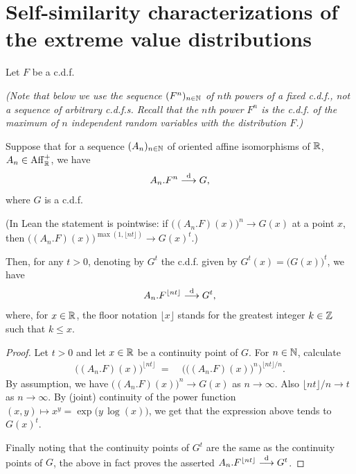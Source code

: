 \section{Self-similarity characterizations of the extreme value distributions}

\begin{lemma}
  \label{lem:continuous-parameter-ev-limit}
  \leanok
  Let $F$ be a c.d.f.

  \emph{(Note that below we use
  the sequence $(F^n)_{n \in \mathbb{N}}$ of $n$th powers of a fixed c.d.f.,
  not a sequence of arbitrary c.d.f.s.
  Recall that the $n$th power $F^n$ is the c.d.f. of the maximum
  of $n$ independent random variables with the distribution $F$.)}

  Suppose that for a sequence $(A_n)_{n \in \mathbb{N}}$ of oriented
  affine isomorphisms of $\mathbb{R}$, $A_n \in \mathrm{Aff}^+_{\mathbb{R}}$, we have
  \begin{align*}
    A_n.F^n \overset{\mathrm{d}}{\longrightarrow} G ,
  \end{align*}
  where $G$ is a c.d.f.

  (In Lean the statement is pointwise: if $\big((A_n.F)(x)\big)^n \to G(x)$ at a point $x$,
  then $\big((A_n.F)(x)\big)^{\max(1, \lfloor n t \rfloor)} \to G(x)^t$.)

  Then, for any $t > 0$, denoting by $G^t$ the c.d.f. given by
  $G^t(x) = \big( G(x) \big)^t$, we have
  \begin{align*}
    A_{n}.F^{\lfloor n t \rfloor} \overset{\mathrm{d}}{\longrightarrow} G^t ,
  \end{align*}
  where, for $x \in \mathbb{R}$, the floor notation $\lfloor x \rfloor$ stands
  for the greatest integer $k \in \mathbb{Z}$ such that $k \le x$.
\end{lemma}
\begin{proof}
  \leanok
  Let $t > 0$ and let $x \in \mathbb{R}$ be a continuity point of $G$.
  For $n \in \mathbb{N}$, calculate
  \begin{align*}
      \big((A_n . F) (x) \big)^{\lfloor n t \rfloor}
    \; = \; & \Big( \big((A_n . F) (x) \big)^n \Big)^{\lfloor n t \rfloor / n} .
  \end{align*}
  By assumption, we have $\big((A_n . F) (x) \big)^n \to G(x)$ as $n \to \infty$.
  Also $\lfloor n t \rfloor / n \to t$ as $n \to \infty$.
  By (joint) continuity of the power function
  $(x,y) \mapsto x^y = \exp\big( y \, \log(x) \big)$,
  we get that the expression above tends to $G(x)^t$.

  Finally noting that the continuity points of $G^t$ are the same as the
  continuity points of $G$, the above in fact proves the asserted
  $A_{n}.F^{\lfloor n t \rfloor} \overset{\mathrm{d}}{\longrightarrow} G^t$.
\end{proof}

